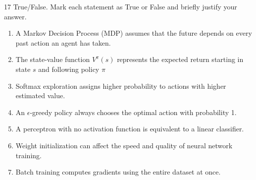 \documentclass[11pt]{article}
\begin{document}
\begin{problem}{1}{7}
True/False. Mark each statement as True or False and briefly justify your answer.
\begin{enumerate}[label=(\alph*)]
\item A Markov Decision Process (MDP) assumes that the future depends on every past action an agent has taken.
\item The state-value function $V^{\pi}(s)$ represents the expected return starting in state $s$ and following policy $\pi$
\item Softmax exploration assigns higher probability to actions with higher estimated value.
\item An $\epsilon$-greedy policy always chooses the optimal action with probability 1.
\item A perceptron with no activation function is equivalent to a linear classifier.
\item Weight initialization can affect the speed and quality of neural network training.
\item Batch training computes gradients using the entire dataset at once.

\end{enumerate}
\end{problem}

\begin{studentanswer}[10]
\end{studentanswer}
\end{document}
